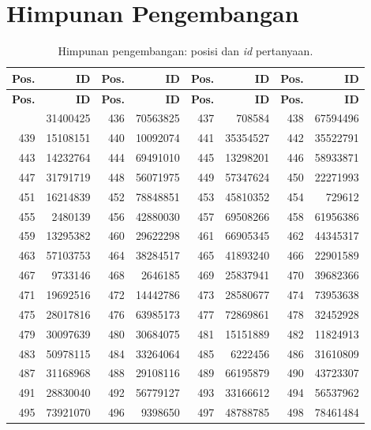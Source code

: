 \normalsize
\section{Himpunan Pengembangan}
\label{sec:lamp-id-dev}

\scriptsize

\begin{longtable}{|r|r|r|r|r|r|r|r|}
\caption{Himpunan pengembangan: posisi dan \emph{id} pertanyaan.}\label{tab:lamp-id-dev}\\
\hline
\textbf{Pos.} & \textbf{ID} & \textbf{Pos.} & \textbf{ID} & \textbf{Pos.} & \textbf{ID} & \textbf{Pos.} & \textbf{ID} \\
\hline
\endfirsthead
\hline
\textbf{Pos.} & \textbf{ID} & \textbf{Pos.} & \textbf{ID} & \textbf{Pos.} & \textbf{ID} & \textbf{Pos.} & \textbf{ID} \\
\hline
\endhead
\hline
\endfoot
435 & 31400425 & 436 & 70563825 & 437 & 708584 & 438 & 67594496 \\
439 & 15108151 & 440 & 10092074 & 441 & 35354527 & 442 & 35522791 \\
443 & 14232764 & 444 & 69491010 & 445 & 13298201 & 446 & 58933871 \\
447 & 31791719 & 448 & 56071975 & 449 & 57347624 & 450 & 22271993 \\
451 & 16214839 & 452 & 78848851 & 453 & 45810352 & 454 & 729612 \\
455 & 2480139 & 456 & 42880030 & 457 & 69508266 & 458 & 61956386 \\
459 & 13295382 & 460 & 29622298 & 461 & 66905345 & 462 & 44345317 \\
463 & 57103753 & 464 & 38284517 & 465 & 41893240 & 466 & 22901589 \\
467 & 9733146 & 468 & 2646185 & 469 & 25837941 & 470 & 39682366 \\
471 & 19692516 & 472 & 14442786 & 473 & 28580677 & 474 & 73953638 \\
475 & 28017816 & 476 & 63985173 & 477 & 72869861 & 478 & 32452928 \\
479 & 30097639 & 480 & 30684075 & 481 & 15151889 & 482 & 11824913 \\
483 & 50978115 & 484 & 33264064 & 485 & 6222456 & 486 & 31610809 \\
487 & 31168968 & 488 & 29108116 & 489 & 66195879 & 490 & 43723307 \\
491 & 28830040 & 492 & 56779127 & 493 & 33166612 & 494 & 56537962 \\
495 & 73921070 & 496 & 9398650 & 497 & 48788785 & 498 & 78461484 \\

\end{longtable}
